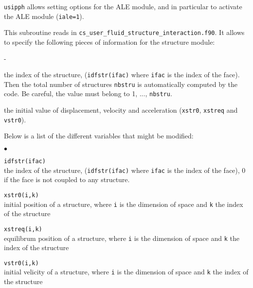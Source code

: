 {{{\texttt{usipph} allows setting options for the ALE module, and in
particular to activate the ALE module (\texttt{iale=1}).


This subroutine reads in \texttt{cs\_user\_fluid\_structure\_interaction.f90}. It allows to specify the following pieces of information for the structure module:
\begin{list}{-}{}
  \item the index of the structure, (\texttt{idfstr(ifac)} where \texttt{ifac} is the index of the face). Then the total number of structures \texttt{nbstru} is automatically computed by the code. Be careful, the value must belong to 1, ..., \texttt{nbstru}.
  \item the initial value of displacement, velocity and acceleration
    (\texttt{xstr0}, \texttt{xstreq} and \texttt{vstr0}).
\end{list}

Below is a list of the different variables that might be modified:

\begin{list}{$\bullet$}{}

\item{\texttt{idfstr(ifac)}} \\
{the index of the structure, (\texttt{idfstr(ifac)} where \texttt{ifac} is the index of the face), 0 if the face is not coupled to any structure.}

\item{\texttt{xstr0(i,k)}} \\
{initial position of a structure, where \texttt{i} is the dimension of space
and \texttt{k} the index of the structure}

\item{\texttt{xstreq(i,k)}} \\
{equilibrum position of a structure, where \texttt{i} is the dimension of space
and \texttt{k} the index of the structure}

\item{\texttt{vstr0(i,k)}} \\
{initial velicity of a structure, where \texttt{i} is the dimension of space
and \texttt{k} the index of the structure }
\end{list}

}}}
